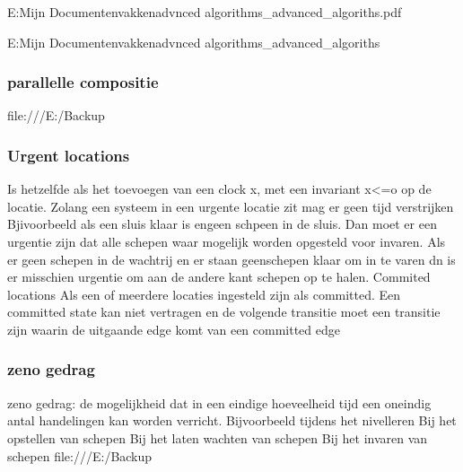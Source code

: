 E:\Backup Mijn Documenten\Hogeschool vakken\TINLab advnced algorithms\tinlab_advanced_algoriths\lesmateriaal\modelchecking.pdf





E:\Backup Mijn Documenten\Hogeschool vakken\TINLab advnced algorithms\tinlab_advanced_algoriths\lesmateriaal
\subsubsection{parallelle compositie}

file:///E:/Backup%
\subsubsection{Urgent locations}

Is hetzelfde als het toevoegen van een clock x, met een invariant x<=o op de locatie. Zolang een systeem in een urgente locatie zit mag er geen tijd verstrijken
Bjivoorbeeld als een sluis klaar is engeen schpeen in de sluis. Dan moet er een urgentie zijn dat alle schepen waar mogelijk worden opgesteld voor invaren. Als er geen schepen in de wachtrij en er staan geenschepen klaar om in te varen dn is er misschien urgentie om aan de andere kant schepen op te halen.
Commited locations
Als een of meerdere locaties ingesteld zijn als committed. Een committed state kan niet vertragen  en de volgende transitie moet een transitie zijn waarin de uitgaande edge komt van een committed edge

\subsubsection{zeno gedrag}
zeno gedrag: de mogelijkheid dat in een eindige hoeveelheid tijd een oneindig antal handelingen kan worden verricht.
Bijvoorbeeld tijdens het nivelleren
Bij het opstellen van schepen
Bij het laten wachten van schepen
Bij het invaren van schepen
file:///E:/Backup%
